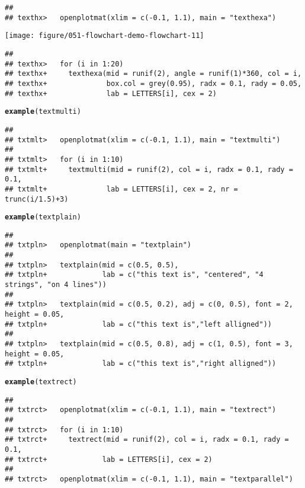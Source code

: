\documentclass{article}\usepackage[]{graphicx}\usepackage[]{color}
\makeatletter
\def\maxwidth{ %
  \ifdim\Gin@nat@width>\linewidth
    \linewidth
  \else
    \Gin@nat@width
  \fi
}
\newcommand{\hlstd}[1]{\textcolor[rgb]{0.345,0.345,0.345}{#1}}%
\newcommand{\hlkwd}[1]{\textcolor[rgb]{0.737,0.353,0.396}{\textbf{#1}}}%
\newenvironment{kframe}{%
 \def\at@end@of@kframe{}%
 \ifinner\ifhmode%
  \def\at@end@of@kframe{\end{minipage}}%
  \begin{minipage}{\columnwidth}%
 \fi\fi%
 \def\FrameCommand##1{\hskip\@totalleftmargin \hskip-\fboxsep
 \colorbox{shadecolor}{##1}\hskip-\fboxsep
     \hskip-\linewidth \hskip-\@totalleftmargin \hskip\columnwidth}%
 \MakeFramed {\advance\hsize-\width
   \@totalleftmargin\z@ \linewidth\hsize
   \@setminipage}}%
 {\par\unskip\endMakeFramed%
 \at@end@of@kframe}
\newenvironment{knitrout}{}{} %
\makeatother
\begin{document}
\begin{knitrout}
\begin{kframe}
\begin{alltt}
\end{alltt}
\begin{verbatim}
## 
## texthx>   openplotmat(xlim = c(-0.1, 1.1), main = "texthexa")
\end{verbatim}
\end{kframe}
\texttt{[image: figure/051-flowchart-demo-flowchart-11]} 
\begin{kframe}\begin{verbatim}
## 
## texthx>   for (i in 1:20) 
## texthx+     texthexa(mid = runif(2), angle = runif(1)*360, col = i,
## texthx+              box.col = grey(0.95), radx = 0.1, rady = 0.05,
## texthx+              lab = LETTERS[i], cex = 2)
\end{verbatim}
\begin{alltt}
\hlkwd{example}\hlstd{(textmulti)}
\end{alltt}
\begin{verbatim}
## 
## txtmlt>   openplotmat(xlim = c(-0.1, 1.1), main = "textmulti")
## 
## txtmlt>   for (i in 1:10) 
## txtmlt+     textmulti(mid = runif(2), col = i, radx = 0.1, rady = 0.1,
## txtmlt+              lab = LETTERS[i], cex = 2, nr = trunc(i/1.5)+3)
\end{verbatim}
\begin{alltt}
\hlkwd{example}\hlstd{(textplain)}
\end{alltt}
\begin{verbatim}
## 
## txtpln>   openplotmat(main = "textplain")
## 
## txtpln>   textplain(mid = c(0.5, 0.5), 
## txtpln+             lab = c("this text is", "centered", "4 strings", "on 4 lines"))
## 
## txtpln>   textplain(mid = c(0.5, 0.2), adj = c(0, 0.5), font = 2, height = 0.05,
## txtpln+             lab = c("this text is","left alligned"))
## 
## txtpln>   textplain(mid = c(0.5, 0.8), adj = c(1, 0.5), font = 3, height = 0.05, 
## txtpln+             lab = c("this text is","right alligned"))
\end{verbatim}
\begin{alltt}
\hlkwd{example}\hlstd{(textrect)}
\end{alltt}
\begin{verbatim}
## 
## txtrct>   openplotmat(xlim = c(-0.1, 1.1), main = "textrect")
## 
## txtrct>   for (i in 1:10) 
## txtrct+     textrect(mid = runif(2), col = i, radx = 0.1, rady = 0.1,
## txtrct+             lab = LETTERS[i], cex = 2)
## 
## txtrct>   openplotmat(xlim = c(-0.1, 1.1), main = "textparallel")
\end{verbatim}
\end{kframe}

\end{knitrout}
\end{document}
